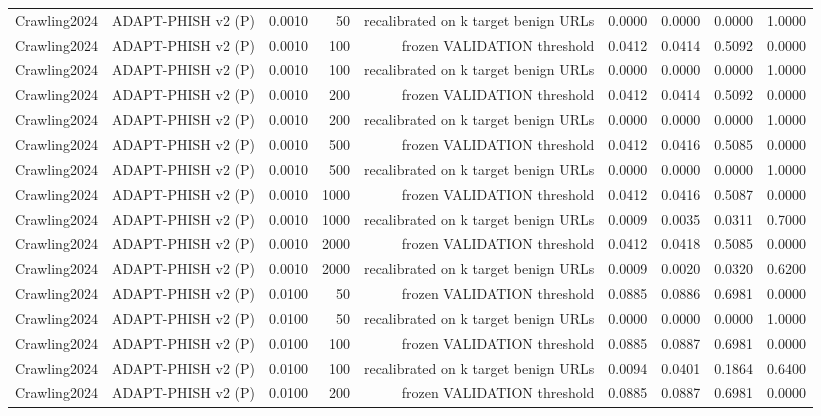 \begin{table}[t]
\begin{tabular}{llrrrrrrr}
Crawling2024 & ADAPT-PHISH v2 (P) & 0.0010 & 50 & recalibrated on k target benign URLs & 0.0000 & 0.0000 & 0.0000 & 1.0000 \\
Crawling2024 & ADAPT-PHISH v2 (P) & 0.0010 & 100 & frozen VALIDATION threshold & 0.0412 & 0.0414 & 0.5092 & 0.0000 \\
Crawling2024 & ADAPT-PHISH v2 (P) & 0.0010 & 100 & recalibrated on k target benign URLs & 0.0000 & 0.0000 & 0.0000 & 1.0000 \\
Crawling2024 & ADAPT-PHISH v2 (P) & 0.0010 & 200 & frozen VALIDATION threshold & 0.0412 & 0.0414 & 0.5092 & 0.0000 \\
Crawling2024 & ADAPT-PHISH v2 (P) & 0.0010 & 200 & recalibrated on k target benign URLs & 0.0000 & 0.0000 & 0.0000 & 1.0000 \\
Crawling2024 & ADAPT-PHISH v2 (P) & 0.0010 & 500 & frozen VALIDATION threshold & 0.0412 & 0.0416 & 0.5085 & 0.0000 \\
Crawling2024 & ADAPT-PHISH v2 (P) & 0.0010 & 500 & recalibrated on k target benign URLs & 0.0000 & 0.0000 & 0.0000 & 1.0000 \\
Crawling2024 & ADAPT-PHISH v2 (P) & 0.0010 & 1000 & frozen VALIDATION threshold & 0.0412 & 0.0416 & 0.5087 & 0.0000 \\
Crawling2024 & ADAPT-PHISH v2 (P) & 0.0010 & 1000 & recalibrated on k target benign URLs & 0.0009 & 0.0035 & 0.0311 & 0.7000 \\
Crawling2024 & ADAPT-PHISH v2 (P) & 0.0010 & 2000 & frozen VALIDATION threshold & 0.0412 & 0.0418 & 0.5085 & 0.0000 \\
Crawling2024 & ADAPT-PHISH v2 (P) & 0.0010 & 2000 & recalibrated on k target benign URLs & 0.0009 & 0.0020 & 0.0320 & 0.6200 \\
Crawling2024 & ADAPT-PHISH v2 (P) & 0.0100 & 50 & frozen VALIDATION threshold & 0.0885 & 0.0886 & 0.6981 & 0.0000 \\
Crawling2024 & ADAPT-PHISH v2 (P) & 0.0100 & 50 & recalibrated on k target benign URLs & 0.0000 & 0.0000 & 0.0000 & 1.0000 \\
Crawling2024 & ADAPT-PHISH v2 (P) & 0.0100 & 100 & frozen VALIDATION threshold & 0.0885 & 0.0887 & 0.6981 & 0.0000 \\
Crawling2024 & ADAPT-PHISH v2 (P) & 0.0100 & 100 & recalibrated on k target benign URLs & 0.0094 & 0.0401 & 0.1864 & 0.6400 \\
Crawling2024 & ADAPT-PHISH v2 (P) & 0.0100 & 200 & frozen VALIDATION threshold & 0.0885 & 0.0887 & 0.6981 & 0.0000 \\

\end{tabular}
\end{table}
